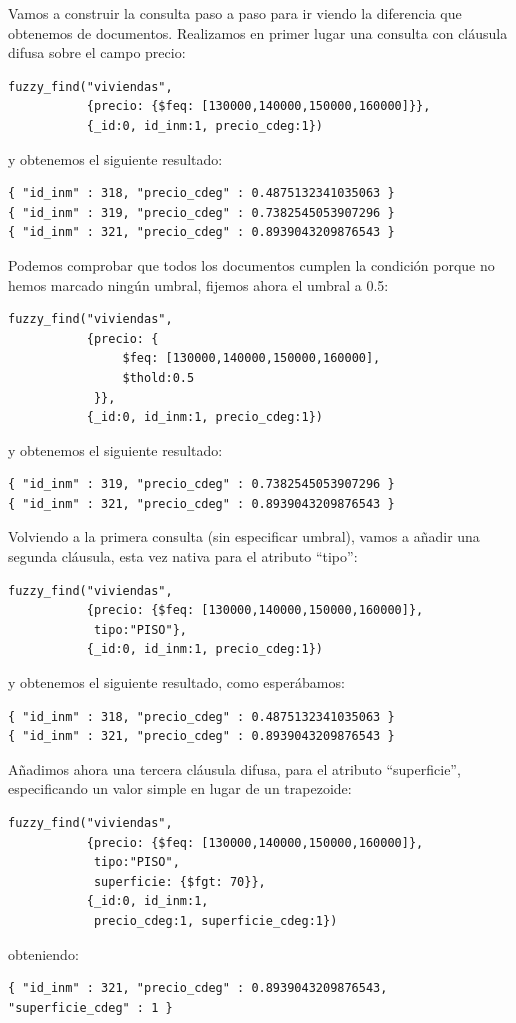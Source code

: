 \begin{example}
Vamos a construir la consulta paso a paso para ir viendo la diferencia que obtenemos de documentos. Realizamos en primer lugar una consulta con cláusula difusa sobre el campo precio:
%
\begin{verbatim}
fuzzy_find("viviendas", 
           {precio: {$feq: [130000,140000,150000,160000]}}, 
           {_id:0, id_inm:1, precio_cdeg:1})
\end{verbatim}
%
y obtenemos el siguiente resultado:
%
\begin{lstlisting}[numbers=none]
{ "id_inm" : 318, "precio_cdeg" : 0.4875132341035063 }
{ "id_inm" : 319, "precio_cdeg" : 0.7382545053907296 }
{ "id_inm" : 321, "precio_cdeg" : 0.8939043209876543 }
\end{lstlisting}
%
Podemos comprobar que todos los documentos cumplen la condición porque no hemos marcado ningún umbral, fijemos ahora el umbral a 0.5:
%
\begin{verbatim}
fuzzy_find("viviendas", 
           {precio: {
                $feq: [130000,140000,150000,160000], 
                $thold:0.5
            }}, 
           {_id:0, id_inm:1, precio_cdeg:1})
\end{verbatim}
%
y obtenemos el siguiente resultado:
%
\begin{lstlisting}[numbers=none]
{ "id_inm" : 319, "precio_cdeg" : 0.7382545053907296 }
{ "id_inm" : 321, "precio_cdeg" : 0.8939043209876543 }
\end{lstlisting}
%
Volviendo a la primera consulta (sin especificar umbral), vamos a añadir una segunda cláusula, esta vez nativa para el atributo ``tipo'':
%
\begin{verbatim}
fuzzy_find("viviendas", 
           {precio: {$feq: [130000,140000,150000,160000]}, 
            tipo:"PISO"}, 
           {_id:0, id_inm:1, precio_cdeg:1})
\end{verbatim}
%
y obtenemos el siguiente resultado, como esperábamos:
%
\begin{lstlisting}[numbers=none]
{ "id_inm" : 318, "precio_cdeg" : 0.4875132341035063 }
{ "id_inm" : 321, "precio_cdeg" : 0.8939043209876543 }
\end{lstlisting}
%
Añadimos ahora una tercera cláusula difusa, para el atributo ``superficie'', especificando un valor simple en lugar de un trapezoide:
%
\begin{verbatim}
fuzzy_find("viviendas", 
           {precio: {$feq: [130000,140000,150000,160000]}, 
            tipo:"PISO", 
            superficie: {$fgt: 70}}, 
           {_id:0, id_inm:1, 
            precio_cdeg:1, superficie_cdeg:1})
\end{verbatim}
%
obteniendo:
%
\begin{lstlisting}[numbers=none]
{ "id_inm" : 321, "precio_cdeg" : 0.8939043209876543, "superficie_cdeg" : 1 }
\end{lstlisting}
\end{example}
